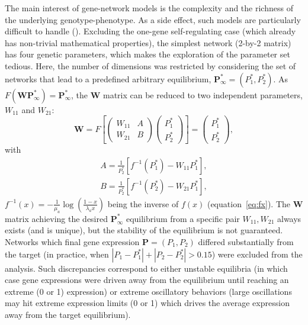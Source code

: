 \documentclass{article}
\begin{document}
The main interest of gene-network models is the complexity and the richness of the underlying genotype-phenotype. As a side effect, such models are particularly difficult to handle (\cite{CTH11,LP12}). Excluding the one-gene self-regulating case (which already has non-trivial mathematical properties), the simplest network (2-by-2 matrix) has four genetic parameters, which makes the exploration of the parameter set tedious. Here, the number of dimensions was restricted by considering the set of networks that lead to a predefined arbitrary equilibrium, $\bm P^\ast_\infty = (P^\ast_1, P^\ast_2)$. As $F(\bm W \bm P^\ast_\infty) = \bm P^\ast_\infty$, the $\bm W$ matrix can be reduced to two independent parameters, $W_{11}$ and $W_{21}$:
\begin{equation}
    \bm W = F \left [\begin{pmatrix} W_{11} & A \\ W_{21} & B \end{pmatrix}  \begin{pmatrix} P^\ast_1 \\ P^\ast_2 \end{pmatrix} \right] = \begin{pmatrix}P^\ast_1 \\ P^\ast_2 \end{pmatrix},
\end{equation}
\noindent with
\begin{equation}
    \begin{split}
        A = \frac{1}{P^\ast_2} [f^{-1}(P^\ast_1)-W_{11}P^\ast_1], \\
        B = \frac{1}{P^\ast_2} [f^{-1}(P^\ast_2) - W_{21} P^\ast_1],
    \end{split}
\end{equation}
\noindent $f^{-1}(x) = -\frac{1}{\mu_a} \log \left( \frac{1-x}{\lambda_a x} \right)$ being the inverse of $f(x)$ (equation~\ref{eq:fx}). The $\bm W$ matrix achieving the desired $\bm P^\ast_\infty$ equilibrium from a specific pair $W_{11}, W_{21}$ always exists (and is unique), but the stability of the equilibrium is not guaranteed. Networks which final gene expression $\bm P = (P_1,P_2)$ differed substantially from the target (in practice, when $|P_1 - P^\ast_1| + |P_2 - P^\ast_2| > 0.15$) were excluded from the analysis. Such discrepancies correspond to either unstable equilibria (in which case gene expressions were driven away from the equilibrium until reaching an extreme (0 or 1) expression) or extreme oscillatory behaviors (large oscillations may hit extreme expression limits (0 or 1) which drives the average expression away from the target equilibrium). 
\end{document}
